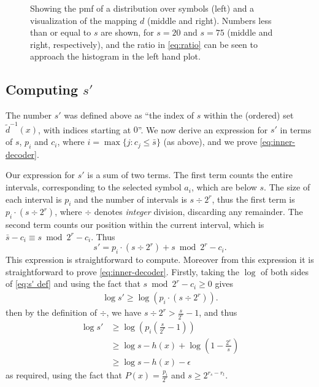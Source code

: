\documentclass{article}
\theoremstyle{definition}
\begin{document}
\begin{figure}[ht]
  \centering
  \drawpmf \quad {} \quad {}
  \caption{
    Showing the pmf of a distribution over symbols (left) and a visualization
    of the mapping \(d\) (middle and right).  Numbers less than or equal to
    \(s\) are shown, for \(s=20\) and \(s=75\) (middle and right,
    respectively), and the ratio in \cref{eq:ratio} can be seen to approach the
    histogram in the left hand plot.
  }\label{fig:visual-ans}
\end{figure}

\subsection{Computing \(s'\)}
The number \(s'\) was defined above as ``the index of \(s\) within the
(ordered) set \(\tilde d^{-1}(x)\), with indices starting at \(0\)''. We now
derive an expression for \(s'\) in terms of \(s\), \(p_i\) and \(c_i\), where
\(i = \max\{j: c_j \leq \bar s\}\) (as above), and we prove
\cref{eq:inner-decoder}.

Our expression for \(s'\) is a sum of two terms. The first term counts the
entire intervals, corresponding to the selected symbol \(a_i\), which are below
\(s\). The size of each interval is \(p_i\) and the number of intervals is
\(s\div 2^{r}\), thus the first term is \(p_i \cdot (s \div 2^{r})\), where
\(\div\) denotes \emph{integer} division, discarding any remainder.  The second
term counts our position within the current interval, which is \(\bar s - c_i
\equiv s\bmod 2^{r} - c_i\). Thus
\begin{equation}\label{eq:s' def}
  s' = p_i \cdot (s \div 2^{r}) + s\bmod 2^{r} - c_i.
\end{equation}
This expression is straightforward to compute. Moreover from this expression it
is straightforward to prove \cref{eq:inner-decoder}. Firstly, taking the
\(\log\) of both sides of \cref{eq:s' def} and using the fact that \(s\bmod
2^{r} - c_i \geq 0\) gives
\begin{align}
  \log s' \geq \log (p_i\cdot (s\div 2^{r})).
\end{align}
then by the definition of \(\div\), we have \(s\div 2^{r} > \frac{s}{2^{r}}
- 1\), and thus
\begin{align}
  \log s'
    &\geq \log\left(p_i\left(\frac{s}{2^{r}} -1\right)\right)\\
    &\geq \log s - h(x) + \log\left(1 - \frac{2^{r}}{s}\right)\\
    &\geq \log s - h(x) - \epsilon
\end{align}
as required, using the fact that \(P(x) = \frac{p_i}{2^{r}}\) and \(s \geq
2^{r_s - r_t}\).
\end{document}

